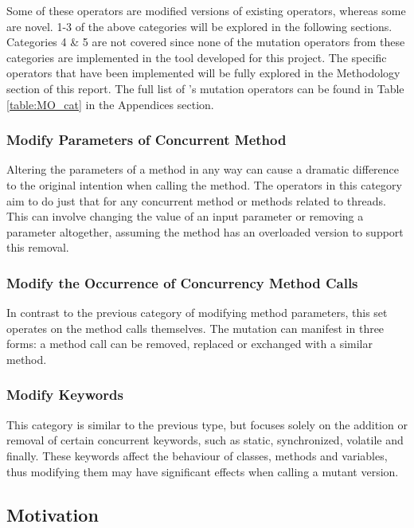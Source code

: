 \documentclass[a4paper,12pt]{article}
\begin{document}
Some of these operators are modified versions of existing operators, whereas some are novel. 1-3 of the above categories will be explored in the following sections. Categories 4 \& 5 are not covered since none of the mutation operators from these categories are implemented in the tool developed for this project. The specific operators that have been implemented will be fully explored in the Methodology section of this report. The full list of \citeauthor{bradbury06}'s mutation operators can be found in Table \ref{table:MO_cat} in the Appendices section.


\subsubsection{Modify Parameters of Concurrent Method} \label{Modify Parameters}

Altering the parameters of a method in any way can cause a dramatic difference to the original intention when calling the method. The operators in this category aim to do just that for any concurrent method or methods related to threads. This can involve changing the value of an input parameter or removing a parameter altogether, assuming the method has an overloaded version to support this removal.  


\subsubsection{Modify the Occurrence of Concurrency Method Calls} \label{Modify Method Calls}

In contrast to the previous category of modifying method parameters, this set operates on the method calls themselves. The mutation can manifest in three forms: a method call can be removed, replaced or exchanged with a similar method.   


\subsubsection{Modify Keywords} \label{Modify Keywords}

This category is similar to the previous type, but focuses solely on the addition or removal of certain concurrent keywords, such as static, synchronized, volatile and finally. These keywords affect the behaviour of classes, methods and variables, thus modifying them may have significant effects when calling a mutant version.


\subsection{Motivation}
\end{document}
